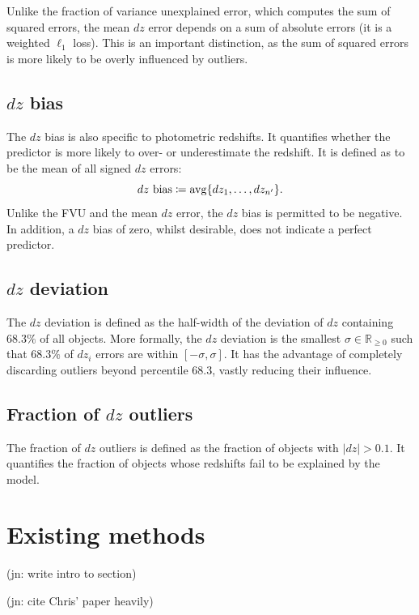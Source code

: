 \documentclass[11pt,twoside,openright]{report}
\newcommand\bbR{\mathbb{R}}
\newcommand\abs[1]{\left|#1\right|}
\DeclareMathOperator{\avg}{avg}
\newcommand\jn[1]{{\color{red}(jn: #1)}}
\begin{document}
Unlike the fraction of variance unexplained error, which computes the sum of squared errors, the mean $dz$ error depends on a sum of absolute errors (it is a weighted $\ell_1$ loss). This is an important distinction, as the sum of squared errors is more likely to be overly influenced by outliers.

\subsection{$dz$ bias}
\label{sec:dz_bias}

The $dz$ bias is also specific to photometric redshifts. It quantifies whether the predictor is more likely to over- or underestimate the redshift. It is defined as to be the mean of all signed $dz$ errors:\[
  \textrm{$dz$ bias} \coloneqq \avg\{ dz_1, \dots, dz_{n'} \} \text.
\] Unlike the FVU and the mean $dz$ error, the $dz$ bias is permitted to be negative. In addition, a $dz$ bias of zero, whilst desirable, does not indicate a perfect predictor.

\subsection{$dz$ deviation}
\label{sec:dz_deviation}

The $dz$ deviation is defined as the half-width of the deviation of $dz$ containing $68.3\%$ of all objects. More formally, the $dz$ deviation is the smallest $\sigma \in \bbR_{\geq0}$ such that $68.3\%$ of $dz_i$ errors are within $[-\sigma, \sigma]$. It has the advantage of completely discarding outliers beyond percentile $68.3$, vastly reducing their influence.

\subsection{Fraction of $dz$ outliers}
\label{sec:fraction_dz_outliers}

The fraction of $dz$ outliers is defined as the fraction of objects with $\abs{dz} > 0.1$. It quantifies the fraction of objects whose redshifts fail to be explained by the model.

\section{Existing methods}

\jn{write intro to section}

\jn{cite Chris' paper heavily}
\end{document}
